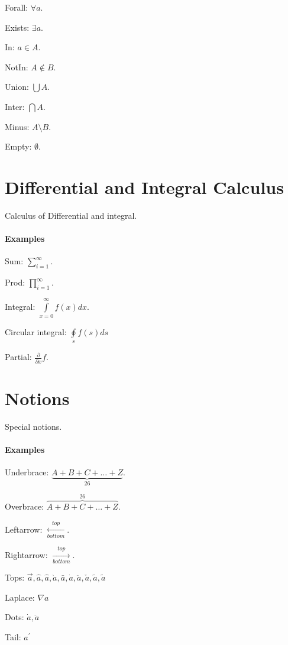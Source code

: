 \documentclass{article}[20200304]
\begin{document}
Forall: \(\forall a\).

Exists: \(\exists a\).

In: \(a \in A\).

NotIn: \(A \notin B\).

Union: \(\bigcup A\).

Inter: \(\bigcap A\).

Minus: \(A \setminus B\).

Empty: \(\emptyset\).

\section{Differential and Integral Calculus}
Calculus of Differential and integral.

\paragraph{Examples}

Sum: \(\sum \limits_{i=1}^{\infty}\).

Prod: \(\prod \limits_{i=1}^{\infty}\).

Integral: \(\int \limits_{x=0}^{\infty} f(x) d{x}\).

Circular integral: \(\oint \limits_{s} f(s) d{s}\)

Partial: \(\frac{\partial}{\partial x} f\).

\section{Notions}
Special notions.

\paragraph{Examples}

Underbrace: \(\underbrace{A+B+C+ \dots +Z}_{\text{26}}\).

Overbrace: \(\overbrace{A+B+C+ \dots +Z}^{\text{26}}\).

Leftarrow: \(\xleftarrow[bottom]{top}\).

Rightarrow: \(\xrightarrow[bottom]{top}\).

Tops: \(\vec{a}, \hat{a}, \widehat{a}, \grave{a}, \bar{a}, \dot{a}, \ddot{a}, \check{a}, \tilde{a}, \widetilde{a}\)

Laplace: \(\nabla a\)

Dots: \(\dot{a}, \ddot{a}\)

Tail: \(a^{'}\)
\end{document}
